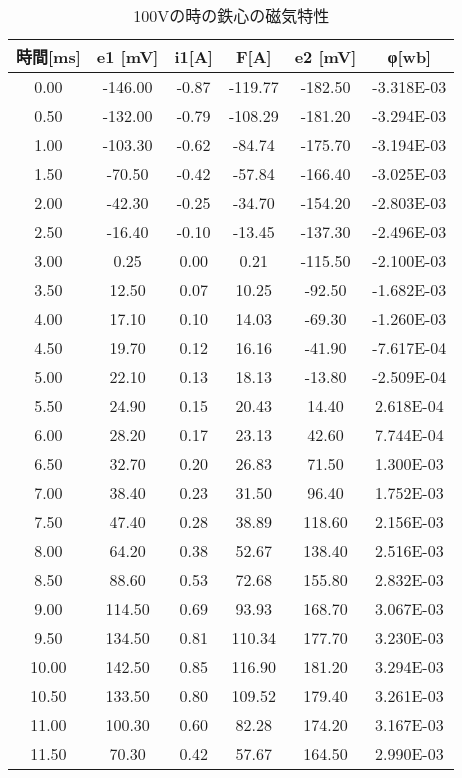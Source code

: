 \documentclass[11pt,a4j]{jsarticle}
\begin{document}
   \begin{table}[htb]
  \begin{center}
    \caption{100Vの時の鉄心の磁気特性}
    \begin{tabular}{cccccc} \toprule
時間[ms]	&	e1 [mV]	&	i1[A]	&	F[A]	&	e2 [mV]	&	φ[wb]	\\ \midrule
0.00	&	-146.00	&	-0.87	&	-119.77		&	-182.50	&	-3.318E-03	\\
0.50	&	-132.00	&	-0.79	&	-108.29		&	-181.20	&	-3.294E-03	\\
1.00	&	-103.30	&	-0.62	&	-84.74		&	-175.70	&	-3.194E-03	\\
1.50	&	-70.50	&	-0.42	&	-57.84		&	-166.40	&	-3.025E-03	\\
2.00	&	-42.30	&	-0.25	&	-34.70		&	-154.20	&	-2.803E-03	\\
2.50	&	-16.40	&	-0.10	&	-13.45		&	-137.30	&	-2.496E-03	\\
3.00	&	0.25	&	0.00	&	0.21		&	-115.50	&	-2.100E-03	\\
3.50	&	12.50	&	0.07	&	10.25		&	-92.50	&	-1.682E-03	\\
4.00	&	17.10	&	0.10	&	14.03		&	-69.30	&	-1.260E-03	\\
4.50	&	19.70	&	0.12	&	16.16		&	-41.90	&	-7.617E-04	\\
5.00	&	22.10	&	0.13	&	18.13		&	-13.80	&	-2.509E-04	\\
5.50	&	24.90	&	0.15	&	20.43		&	14.40	&	2.618E-04	\\
6.00	&	28.20	&	0.17	&	23.13		&	42.60	&	7.744E-04	\\
6.50	&	32.70	&	0.20	&	26.83		&	71.50	&	1.300E-03	\\
7.00	&	38.40	&	0.23	&	31.50		&	96.40	&	1.752E-03	\\
7.50	&	47.40	&	0.28	&	38.89		&	118.60	&	2.156E-03	\\
8.00	&	64.20	&	0.38	&	52.67		&	138.40	&	2.516E-03	\\
8.50	&	88.60	&	0.53	&	72.68		&	155.80	&	2.832E-03	\\
9.00	&	114.50	&	0.69	&	93.93		&	168.70	&	3.067E-03	\\
9.50	&	134.50	&	0.81	&	110.34		&	177.70	&	3.230E-03	\\
10.00	&	142.50	&	0.85	&	116.90		&	181.20	&	3.294E-03	\\
10.50	&	133.50	&	0.80	&	109.52		&	179.40	&	3.261E-03	\\
11.00	&	100.30	&	0.60	&	82.28		&	174.20	&	3.167E-03	\\
11.50	&	70.30	&	0.42	&	57.67		&	164.50	&	2.990E-03	\\

\end{tabular}
\end{center}
\end{table}
\end{document}
